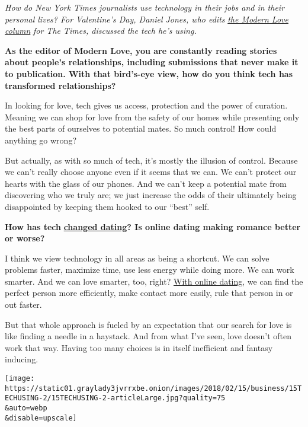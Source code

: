 \emph{How do New York Times journalists use technology in their jobs and
in their personal lives? For Valentine's Day, Daniel Jones, who edits}
\href{https://www.nytimes3xbfgragh.onion/column/modern-love}{\emph{the
Modern Love column}} \emph{for The Times, discussed the tech he's
using.}

\textbf{As the editor of Modern Love, you are constantly reading stories
about people's relationships, including submissions that never make it
to publication. With that bird's-eye view, how do you think tech has
transformed relationships?}

In looking for love, tech gives us access, protection and the power of
curation. Meaning we can shop for love from the safety of our homes
while presenting only the best parts of ourselves to potential mates. So
much control! How could anything go wrong?

But actually, as with so much of tech, it's mostly the illusion of
control. Because we can't really choose anyone even if it seems that we
can. We can't protect our hearts with the glass of our phones. And we
can't keep a potential mate from discovering who we truly are; we just
increase the odds of their ultimately being disappointed by keeping them
hooked to our ``best'' self.

\textbf{How has tech}
\href{https://www.nytimes3xbfgragh.onion/2017/09/21/well/family/the-love-lives-of-digital-natives.html}{\textbf{changed
dating}}\textbf{? Is online dating making romance better or worse?}

I think we view technology in all areas as being a shortcut. We can
solve problems faster, maximize time, use less energy while doing more.
We can work smarter. And we can love smarter, too, right?
\href{https://www.nytimes3xbfgragh.onion/2017/12/21/style/instagram-thirst-traps-dating-breakups.html?rref=collection\%2Ftimestopic\%2FDating\%20and\%20Courtship\&action=click\&contentCollection=timestopics\&region=stream\&module=stream_unit\&version=latest\&contentPlacement=2\&pgtype=collection}{With
online dating}, we can find the perfect person more efficiently, make
contact more easily, rule that person in or out faster.

But that whole approach is fueled by an expectation that our search for
love is like finding a needle in a haystack. And from what I've seen,
love doesn't often work that way. Having too many choices is in itself
inefficient and fantasy inducing.

\texttt{[image: https://static01.graylady3jvrrxbe.onion/images/2018/02/15/business/15TECHUSING-2/15TECHUSING-2-articleLarge.jpg?quality=75\\\&auto=webp\\\&disable=upscale]}


